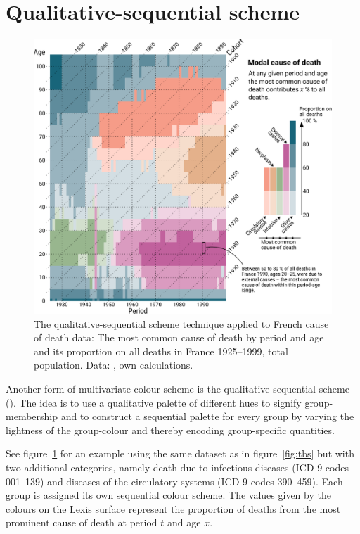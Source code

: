 \documentclass[parskip=half]{scrartcl}
\begin{document}
\section{Qualitative-sequential scheme} %
\label{sec:qss}

\begin{figure}[!htb]
  \centering
  \includegraphics[width = \textwidth]{./fig/qual_seq.pdf}
  \caption{The qualitative-sequential scheme technique applied to French cause of death data: The most common cause of death by period and age and its proportion on all deaths in France 1925--1999, total population. Data: \cite{Vallin2014}, own calculations.}
  \label{fig:qss}
\end{figure}

Another form of multivariate colour scheme is the qualitative-sequential scheme (\cite{Brewer1994}). The idea is to use a qualitative palette of different hues to signify group-membership and to construct a sequential palette for every group by varying the lightness of the group-colour and thereby encoding group-specific quantities.

See figure~\ref{fig:qss} for an example using the same dataset as in figure~\ref{fig:tbs} but with two additional categories, namely death due to infectious diseases (ICD-9 codes 001--139) and diseases of the circulatory systems (ICD-9 codes 390--459). Each group is assigned its own sequential colour scheme. The values given by the colours on the Lexis surface represent the proportion of deaths from the most prominent cause of death at period $t$ and age $x$.
\end{document}
